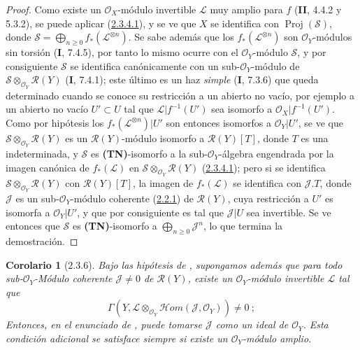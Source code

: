 \documentclass[10pt,oneside,openany]{book}
\theoremstyle{egaenv}\newtheorem*{env}{---}
\theoremstyle{egastatement}
\newtheorem*{corollary}{Corolario}
\theoremstyle{egadescription}
\renewcommand{\geq}{\geqslant}
\begin{document}
\begin{proof}
Como existe un $\mathcal O_X$-módulo invertible $\mathcal L$ muy amplio para $f$ (\textbf{II}, 4.4.2 y 5.3.2), se puede aplicar (\hyperref[III.2.3.4.1-fr]{2.3.4.1}), y se ve que $X$ se identifica con $\operatorname{Proj}(\mathcal S)$, donde $\mathcal S=\bigoplus_{n\geq0}f_*(\mathcal L^{\otimes n})$. Se sabe además que los $f_*(\mathcal L^{\otimes n})$ son $\mathcal O_Y$-módulos sin torsión (\textbf{I}, 7.4.5), por tanto lo mismo ocurre con el $\mathcal O_Y$-módulo $\mathcal S$, y por consiguiente $\mathcal S$ se identifica canónicamente con un sub-$\mathcal O_Y$-módulo de $\mathcal S\otimes_{\mathcal O_Y}\mathcal R(Y)$ (\textbf{I}, 7.4.1); este último es un haz \emph{simple} (\textbf{I}, 7.3.6) que queda determinado cuando se conoce su restricción a un abierto no vacío, por ejemplo a un abierto no vacío $U'\subset U$ tal que $\mathcal L|f^{-1}(U')$ sea isomorfo a $\mathcal O_X|f^{-1}(U')$. Como por hipótesis los $f_*(\mathcal L^{\otimes n})|U'$ son entonces isomorfos a $\mathcal O_Y|U'$, se ve que $\mathcal S\otimes_{\mathcal O_Y}\mathcal R(Y)$ es un $\mathcal R(Y)$-módulo isomorfo a $\mathcal R(Y)[T]$, donde $T$ es una indeterminada, y $\mathcal S$ es \textbf{(TN)}-isomorfo a la sub-$\mathcal O_Y$-álgebra engendrada por la imagen canónica de $f_*(\mathcal L)$ en $\mathcal S\otimes_{\mathcal O_Y}\mathcal R(Y)$ (\hyperref[III.2.3.4.1-fr]{2.3.4.1}); pero si se identifica $\mathcal S\otimes_{\mathcal O_Y}\mathcal R(Y)$ con $\mathcal R(Y)[T]$, la imagen de $f_*(\mathcal L)$ se identifica con $\mathcal J.T$, donde $\mathcal J$ es un sub-$\mathcal O_Y$-módulo coherente (\hyperref[III.2.2.1-fr]{2.2.1}) de $\mathcal R(Y)$, cuya restricción a $U'$ es isomorfa a $\mathcal O_Y|U'$, y que por consiguiente es tal que $\mathcal J|U$ sea invertible. Se ve entonces que $\mathcal S$ es \textbf{(TN)}-isomorfo a $\bigoplus_{n\geq0}\mathcal J^n$, lo que termina la demostración.
\end{proof}

\begin{corollary}[2.3.6]
\label{III.2.3.6}
\label{III.2.3.6-fr}
Bajo las hipótesis de , supongamos además que para todo sub-$\mathcal O_Y$-Módulo coherente
$\mathcal J\neq0$ de $\mathcal R(Y)$, existe un
$\mathcal O_Y$-módulo invertible $\mathcal L$ tal que
\[
\Gamma(Y,\mathcal L\otimes_{\mathcal O_Y}
\mathcal{H}om(\mathcal J,\mathcal O_Y))\neq0~;
\]
Entonces, en el enunciado de , puede tomarse $\mathcal J$ como un ideal de $\mathcal O_Y$.
Esta condición adicional se satisface siempre si existe un $\mathcal O_Y$-módulo amplio.
\end{corollary}
\end{document}
